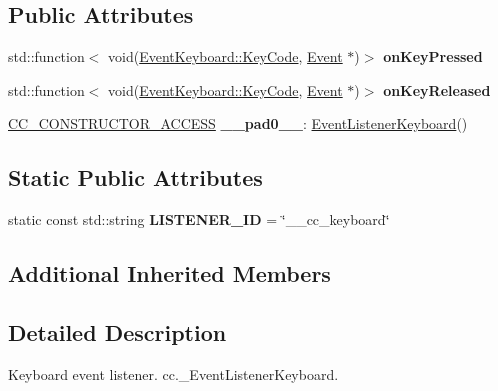 \subsection*{Public Attributes}
\begin{DoxyCompactItemize}
\item 
\mbox{\label{classEventListenerKeyboard_a13328c7e33ec5aa0f2eae4ae210f1281}} 
std\+::function$<$ void(\hyperlink{classEventKeyboard_a7cd3fa46515673276ce8ec7f0e051606}{Event\+Keyboard\+::\+Key\+Code}, \hyperlink{classEvent}{Event} $\ast$)$>$ {\bfseries on\+Key\+Pressed}
\item 
\mbox{\label{classEventListenerKeyboard_a1eac845f9b57aac132b9847414520d1b}} 
std\+::function$<$ void(\hyperlink{classEventKeyboard_a7cd3fa46515673276ce8ec7f0e051606}{Event\+Keyboard\+::\+Key\+Code}, \hyperlink{classEvent}{Event} $\ast$)$>$ {\bfseries on\+Key\+Released}
\item 
\mbox{\label{classEventListenerKeyboard_ac4ed7a42a9db66bb9a399b8ba6355071}} 
\hyperlink{_2cocos2d_2cocos_2base_2ccConfig_8h_a25ef1314f97c35a2ed3d029b0ead6da0}{C\+C\+\_\+\+C\+O\+N\+S\+T\+R\+U\+C\+T\+O\+R\+\_\+\+A\+C\+C\+E\+SS} {\bfseries \+\_\+\+\_\+pad0\+\_\+\+\_\+}\+: \hyperlink{classEventListenerKeyboard}{Event\+Listener\+Keyboard}()
\end{DoxyCompactItemize}
\subsection*{Static Public Attributes}
\begin{DoxyCompactItemize}
\item 
\mbox{\label{classEventListenerKeyboard_abb0dfca7daa6534899df06abdd30b5f2}} 
static const std\+::string {\bfseries L\+I\+S\+T\+E\+N\+E\+R\+\_\+\+ID} = \char`\"{}\+\_\+\+\_\+cc\+\_\+keyboard\char`\"{}
\end{DoxyCompactItemize}
\subsection*{Additional Inherited Members}


\subsection{Detailed Description}
Keyboard event listener.  cc.\+\_\+\+Event\+Listener\+Keyboard. 

